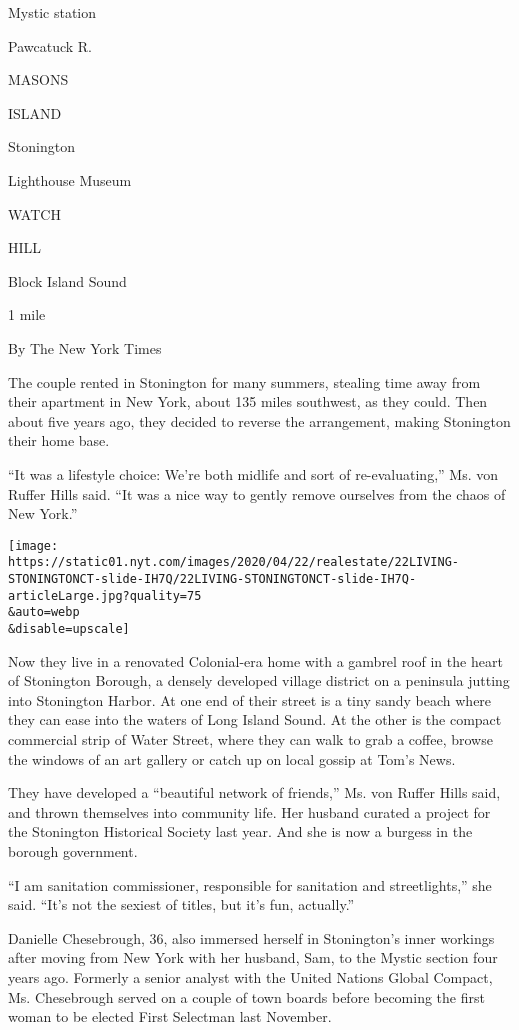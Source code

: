 Mystic station

Pawcatuck R.

MASONS

ISLAND

Stonington

Lighthouse Museum

WATCH

HILL

Block Island Sound

1 mile

By The New York Times

The couple rented in Stonington for many summers, stealing time away
from their apartment in New York, about 135 miles southwest, as they
could. Then about five years ago, they decided to reverse the
arrangement, making Stonington their home base.

``It was a lifestyle choice: We're both midlife and sort of
re-evaluating,'' Ms. von Ruffer Hills said. ``It was a nice way to
gently remove ourselves from the chaos of New York.''

\texttt{[image: https://static01.nyt.com/images/2020/04/22/realestate/22LIVING-STONINGTONCT-slide-IH7Q/22LIVING-STONINGTONCT-slide-IH7Q-articleLarge.jpg?quality=75\\\&auto=webp\\\&disable=upscale]}

Now they live in a renovated Colonial-era home with a gambrel roof in
the heart of Stonington Borough, a densely developed village district on
a peninsula jutting into Stonington Harbor. At one end of their street
is a tiny sandy beach where they can ease into the waters of Long Island
Sound. At the other is the compact commercial strip of Water Street,
where they can walk to grab a coffee, browse the windows of an art
gallery or catch up on local gossip at Tom's News.

They have developed a ``beautiful network of friends,'' Ms. von Ruffer
Hills said, and thrown themselves into community life. Her husband
curated a project for the Stonington Historical Society last year. And
she is now a burgess in the borough government.

``I am sanitation commissioner, responsible for sanitation and
streetlights,'' she said. ``It's not the sexiest of titles, but it's
fun, actually.''

Danielle Chesebrough, 36, also immersed herself in Stonington's inner
workings after moving from New York with her husband, Sam, to the Mystic
section four years ago. Formerly a senior analyst with the United
Nations Global Compact, Ms. Chesebrough served on a couple of town
boards before becoming the first woman to be elected First Selectman
last November.

